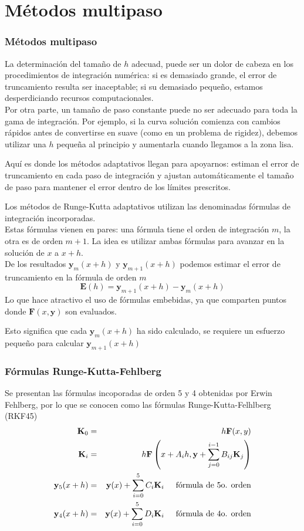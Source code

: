 \section{Métodos multipaso}
\begin{frame}
\frametitle{Métodos multipaso}
La determinación del tamaño de $h$ adecuad, puede ser un dolor de cabeza en los procedimientos de integración numérica: si es demasiado grande, el error de truncamiento resulta ser inaceptable; si su demasiado pequeño, estamos desperdiciando recursos computacionales.
\\
\medskip
Por otra parte, un tamaño de paso constante puede no ser adecuado para toda la gama de integración. Por ejemplo, si la curva solución comienza con cambios rápidos antes de convertirse en suave (como en un problema de rigidez), debemos utilizar una $h$ pequeña al principio y aumentarla cuando llegamos a la zona lisa.
\end{frame}
\begin{frame}
Aquí es donde los métodos adaptativos llegan para apoyarnos: estiman el error de truncamiento en cada paso de integración y ajustan automáticamente el tamaño de paso para mantener el error dentro de los límites prescritos.
\end{frame}
\begin{frame}
Los métodos de Runge-Kutta adaptativos utilizan las denominadas fórmulas de integración incorporadas.
\\
\medskip
Estas fórmulas vienen en pares: una fórmula tiene el orden de integración $m$, la otra es de orden $m + 1$. La idea es utilizar ambas fórmulas para avanzar en la solución de $x$ a $x + h$.
\\
\medskip
De los resultados $\mathbf{y}_{m}(x+h)$ y $\mathbf{y}_{m+1}(x+h)$ podemos estimar el error de truncamiento en la fórmula de orden $m$
\[ \mathbf{E}(h) = \mathbf{y}_{m+1}(x+h) - \mathbf{y}_{m}(x+h) \]
Lo que hace atractivo el uso de fórmulas embebidas, ya que comparten puntos donde $\mathbf{F}(x,\mathbf{y})$ son evaluados.
\end{frame}
\begin{frame}
Esto significa que cada $\mathbf{y}_{m}(x+h)$ ha sido calculado, se requiere un esfuerzo pequeño para calcular $\mathbf{y}_{m+1}(x+h)$
\end{frame}
\begin{frame}
\frametitle{Fórmulas Runge-Kutta-Fehlberg}
Se presentan las fórmulas incoporadas de orden 5 y 4 obtenidas por Erwin Fehlberg, por lo que se conocen como las fórmulas Runge-Kutta-Felhlberg (RKF45)
\begin{eqnarray*}
\mathbf{K}_{0} &=& h \mathbf{F}(x,y) \\
\mathbf{K}_{i} &=& h \mathbf{F} \left( x  + A_{i} h, \mathbf{y} + \sum_{j=0}^{i-1} B_{ij}\mathbf{K}_{j} \right) \\
\mathbf{y}_{5}(x+h) &=& \mathbf{y}(x) + \sum_{i=0}^{5} C_{i} \mathbf{K}_{i} \hspace{0.5cm} \mbox{fórmula de 5o. orden} \\
\mathbf{y}_{4}(x+h) &=& \mathbf{y}(x) + \sum_{i=0}^{5} D_{i} \mathbf{K}_{i} \hspace{0.5cm} \mbox{fórmula de 4o. orden}
\end{eqnarray*}
\end{frame}
